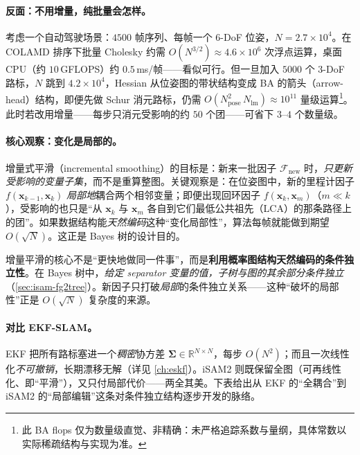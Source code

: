\paragraph{反面：不用增量，纯批量会怎样。}
考虑一个自动驾驶场景：$4500$ 帧序列、每帧一个 $6$-DoF 位姿，$N=2.7\times10^4$。在 COLAMD 排序下批量 Cholesky 约需 $O(N^{3/2})\approx 4.6\times10^6$ 次浮点运算，桌面 CPU（约 $10$\,GFLOPS）约 $0.5$\,ms/帧——看似可行。但一旦加入 $5000$ 个 $3$-DoF 路标，$N$ 跳到 $4.2\times10^4$，Hessian 从位姿图的带状结构变成 BA 的箭头（arrow-head）结构，即便先做 Schur 消元路标，仍需 $O(N_{\text{pose}}^2\,N_{\text{lm}})\approx 10^{11}$ 量级运算\footnote{此 BA flops 仅为数量级直觉、非精确：未严格追踪系数与量纲，具体常数以实际稀疏结构与实现为准。}。此时若改用增量——每步只消元受影响的约 $50$ 个团——可省下 $3$--$4$ 个数量级。

\paragraph{核心观察：变化是局部的。}
增量式平滑（incremental smoothing）的目标是：新来一批因子 $\mathcal{F}_{\text{new}}$ 时，\emph{只更新受影响的变量子集}，而不是重算整图。关键观察是：在位姿图中，新的里程计因子 $f(\mathbf{x}_{k-1},\mathbf{x}_k)$ \emph{局部地}耦合两个相邻变量；即便出现回环因子 $f(\mathbf{x}_k,\mathbf{x}_m)$（$m\ll k$），受影响的也只是“从 $\mathbf{x}_k$ 与 $\mathbf{x}_m$ 各自到它们最低公共祖先（LCA）的那条路径上的团”。如果数据结构能\emph{天然编码}这种“变化局部性”，算法每帧就能做到期望 $O(\sqrt N)$。这正是 Bayes 树的设计目的。

\begin{insight}[增量平滑的本质]
增量平滑的核心不是“更快地做同一件事”，而是\textbf{利用概率图结构天然编码的条件独立性}。在 Bayes 树中，\emph{给定 separator 变量的值，子树与图的其余部分条件独立}（\cref{sec:isam-fg2tree}）。新因子只打破\emph{局部}的条件独立关系——这种“破坏的局部性”正是 $O(\sqrt N)$ 复杂度的来源。
\end{insight}

\paragraph{对比 EKF-SLAM。}
EKF 把所有路标塞进一个\emph{稠密}协方差 $\boldsymbol{\Sigma}\in\mathbb{R}^{N\times N}$，每步 $O(N^2)$；而且一次线性化\emph{不可撤销}，长期漂移无解（详见 \cref{ch:eskf}）。iSAM2 则既保留全图（可再线性化、即“平滑”），又只付局部代价——两全其美。下表给出从 EKF 的“全耦合”到 iSAM2 的“局部编辑”这条对条件独立结构逐步开发的脉络\cite{smith1986estimating,dellaert2006square,kaess2008isam,kaess2010bayestree,kaess2012isam2}。

